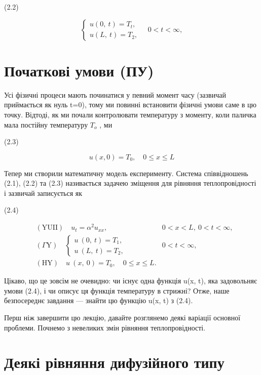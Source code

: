 (2.2)

\[\left\{ \begin{array}{l} u\left(0,\ t\right) = T_{t}, \\ u\left(L,\ t\right) = T_{2}, \end{array} \right. \quad 0 < t < \infty,\]

\section{Початкові умови (ПУ)}\label{ux43fux43eux447ux430ux442ux43aux43eux432ux456-ux443ux43cux43eux432ux438-ux43fux443}

Усі фізичні процеси мають починатися у певний момент часу (зазвичай приймається як нуль t=0), тому ми повинні встановити фізичні умови саме в цю точку. Відтоді, як ми почали контролювати температуру з моменту, коли паличка мала постійну температуру \(T_{\mathrm{ }o}\) , ми

(2.3)

\[u(x, 0) = T_0, \quad 0 \le x \le L\]

Тепер ми створили математичну модель експерименту. Система співвідношень (2.1), (2.2) та (2.3) називається задачею зміщення для рівняння теплопровідності і зазвичай записується як

(2.4)

\[\begin{aligned} & (\text{YUII}) \quad u_t = \alpha^2 u_{xx}, & 0 < x < L, \ 0 < t < \infty, \\ & \left( \Gamma \text{Y} \right) \quad \begin{cases} u \ (0, \ t) = T_1, \\ u \ (L, \ t) = T_2, \end{cases} & 0 < t < \infty, \\ & (\text{HY}) \quad u \ (x, \ 0) = T_0, \quad 0 \leqslant x \leqslant L. \end{aligned}\]

Цікаво, що це зовсім не очевидно: чи існує одна функція u(x, t), яка задовольняє умови (2.4), і чи описує ця функція температуру в стрижні? Отже, наше безпосереднє завдання --- знайти цю функцію u(x, t) з (2.4).

Перш ніж завершити цю лекцію, давайте розглянемо деякі варіації основної проблеми. Почнемо з невеликих змін рівняння теплопровідності.

\section{Деякі рівняння дифузійного типу}\label{ux434ux435ux44fux43aux456-ux440ux456ux432ux43dux44fux43dux43dux44f-ux434ux438ux444ux443ux437ux456ux439ux43dux43eux433ux43e-ux442ux438ux43fux443}

